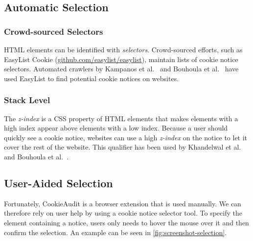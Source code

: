 \subsection{Automatic Selection}
\subsubsection{Crowd-sourced Selectors}
HTML elements can be identified with \emph{selectors}. 
Crowd-sourced efforts, such as EasyList Cookie (\href{https://github.com/easylist/easylist}{github.com/easylist/easylist}), maintain lists of cookie notice selectors.
Automated crawlers by Kampanos et al.~\cite{kampanos2021accept} and Bouhoula et al.~\cite{bouhoula2023automated} have used EasyList to find potential cookie notices on websites.

\subsubsection{Stack Level}
The \emph{z-index} is a CSS property of HTML elements that makes elements with a high index appear above elements with a low index. 
Because a user should quickly see a cookie notice, websites can use a high \emph{z-index} on the notice to let it cover the rest of the website. 
This qualifier has been used by Khandelwal et al.~\cite{khandelwal2023automated} and Bouhoula et al.~\cite{bouhoula2023automated}.

\subsection{User-Aided Selection} \label{subsec:userAidedSelection}
Fortunately, CookieAudit is a browser extension that is used manually.
We can therefore rely on user help by using a cookie notice selector tool.
To specify the element containing a notice, users only needs to hover the mouse over it and then confirm the selection. 
An example can be seen in \cref{fig:screenshot-selection}.

